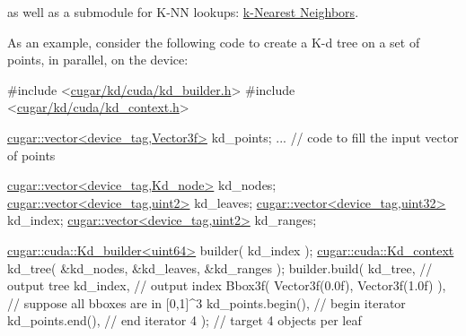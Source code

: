 \begin{DoxyParagraph}{}
as well as a submodule for K-\/\+NN lookups\+: \hyperlink{group__knn}{k-\/\+Nearest Neighbors}. 
\end{DoxyParagraph}
\begin{DoxyParagraph}{}
As an example, consider the following code to create a K-\/d tree on a set of points, in parallel, on the device\+: 
\begin{DoxyCode}
\textcolor{preprocessor}{#include <\hyperlink{kd__builder_8h}{cugar/kd/cuda/kd\_builder.h}>}
\textcolor{preprocessor}{#include <\hyperlink{kd__context_8h}{cugar/kd/cuda/kd\_context.h}>}

\hyperlink{structcugar_1_1vector}{cugar::vector<device\_tag,Vector3f>} kd\_points;
... \textcolor{comment}{// code to fill the input vector of points}

\hyperlink{structcugar_1_1vector}{cugar::vector<device\_tag,Kd\_node>}  kd\_nodes;
\hyperlink{structcugar_1_1vector}{cugar::vector<device\_tag,uint2>}    kd\_leaves;
\hyperlink{structcugar_1_1vector}{cugar::vector<device\_tag,uint32>}   kd\_index;
\hyperlink{structcugar_1_1vector}{cugar::vector<device\_tag,uint2>}    kd\_ranges;

\hyperlink{structcugar_1_1cuda_1_1_kd__builder}{cugar::cuda::Kd\_builder<uint64>} builder( kd\_index );
\hyperlink{structcugar_1_1cuda_1_1_kd__context}{cugar::cuda::Kd\_context} kd\_tree( &kd\_nodes, &kd\_leaves, &kd\_ranges );
builder.build(
    kd\_tree,                                    \textcolor{comment}{// output tree}
    kd\_index,                                   \textcolor{comment}{// output index}
    Bbox3f( Vector3f(0.0f), Vector3f(1.0f) ),   \textcolor{comment}{// suppose all bboxes are in [0,1]^3}
    kd\_points.begin(),                          \textcolor{comment}{// begin iterator}
    kd\_points.end(),                            \textcolor{comment}{// end iterator}
    4 );                                        \textcolor{comment}{// target 4 objects per leaf}
\end{DoxyCode}
 
\end{DoxyParagraph}
